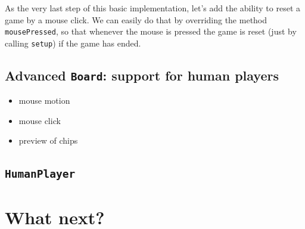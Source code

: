\documentclass{article}
\begin{document}
As the very last step of this basic implementation, let's add the ability to reset a game by a mouse click. We can easily do that by overriding the method \texttt{mousePressed}, so that whenever the mouse is pressed the game is reset (just by calling \texttt{setup}) if the game has ended.




\subsection{Advanced \texttt{Board}: support for human players}


\begin{itemize}
  \item mouse motion
  \item mouse click
  \item preview of chips
\end{itemize}


\subsection{\texttt{HumanPlayer}}



\section*{What next?}
\end{document}
